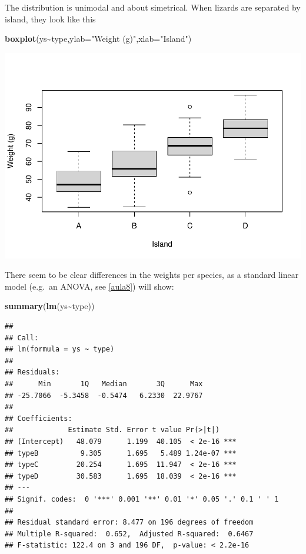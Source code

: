 \documentclass[
]{book}
\newenvironment{Shaded}{\begin{snugshade}}{\end{snugshade}}
\newcommand{\AttributeTok}[1]{\textcolor[rgb]{0.13,0.29,0.53}{#1}}
\newcommand{\FunctionTok}[1]{\textcolor[rgb]{0.13,0.29,0.53}{\textbf{#1}}}
\newcommand{\NormalTok}[1]{#1}
\newcommand{\SpecialCharTok}[1]{\textcolor[rgb]{0.81,0.36,0.00}{\textbf{#1}}}
\newcommand{\StringTok}[1]{\textcolor[rgb]{0.31,0.60,0.02}{#1}}
\begin{document}
The distribution is unimodal and about simetrical. When lizards are separated by island, they look like this

\begin{Shaded}
\begin{Highlighting}[]
\FunctionTok{boxplot}\NormalTok{(ys}\SpecialCharTok{\textasciitilde{}}\NormalTok{type,}\AttributeTok{ylab=}\StringTok{"Weight (g)"}\NormalTok{,}\AttributeTok{xlab=}\StringTok{"Island"}\NormalTok{)}
\end{Highlighting}
\end{Shaded}

\includegraphics{ECOMODbook_files/figure-latex/a10.3-1.pdf}

There seem to be clear differences in the weights per species, as a standard linear model (e.g.~an ANOVA, see \ref{aula8}) will show:

\begin{Shaded}
\begin{Highlighting}[]
\FunctionTok{summary}\NormalTok{(}\FunctionTok{lm}\NormalTok{(ys}\SpecialCharTok{\textasciitilde{}}\NormalTok{type))}
\end{Highlighting}
\end{Shaded}

\begin{verbatim}
## 
## Call:
## lm(formula = ys ~ type)
## 
## Residuals:
##      Min       1Q   Median       3Q      Max 
## -25.7066  -5.3458  -0.5474   6.2330  22.9767 
## 
## Coefficients:
##             Estimate Std. Error t value Pr(>|t|)    
## (Intercept)   48.079      1.199  40.105  < 2e-16 ***
## typeB          9.305      1.695   5.489 1.24e-07 ***
## typeC         20.254      1.695  11.947  < 2e-16 ***
## typeD         30.583      1.695  18.039  < 2e-16 ***
## ---
## Signif. codes:  0 '***' 0.001 '**' 0.01 '*' 0.05 '.' 0.1 ' ' 1
## 
## Residual standard error: 8.477 on 196 degrees of freedom
## Multiple R-squared:  0.652,  Adjusted R-squared:  0.6467 
## F-statistic: 122.4 on 3 and 196 DF,  p-value: < 2.2e-16
\end{verbatim}
\end{document}

